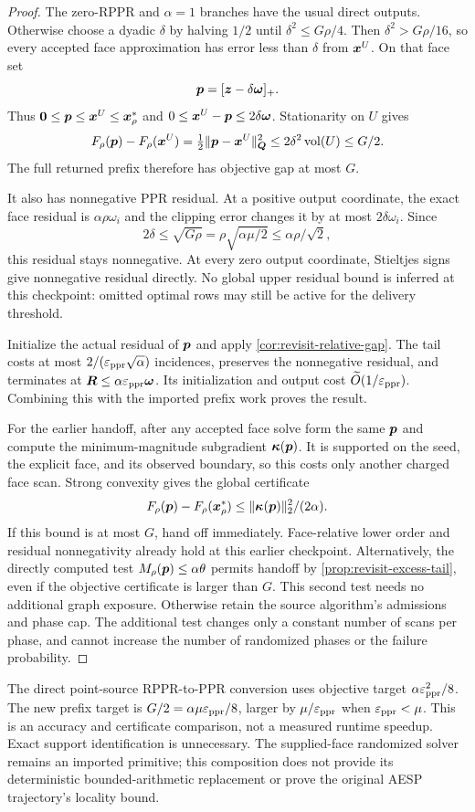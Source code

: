 \begin{proof}
The zero-RPPR and $\alpha=1$ branches have the usual direct outputs.
Otherwise choose a dyadic $\delta$ by halving $1/2$ until
$\delta^2\leq G\rho/4$. Then
$\delta^2>G\rho/16$, so every accepted face approximation has error
less than $\delta$ from $\bm{x}^U$. On that face set
\[
 \bm{p}=[\bm{z}-\delta\bm{\omega}]_+.
\]
Thus $\bm{0}\leq\bm{p}\leq\bm{x}^U\leq\bm{x}_\rho^*$ and
$0\leq\bm{x}^U-\bm{p}\leq2\delta\bm{\omega}$. Stationarity on $U$ gives
\[
 F_\rho(\bm{p})-F_\rho(\bm{x}^U)
 =\tfrac12\|\bm{p}-\bm{x}^U\|_{\bm{Q}}^2
 \leq2\delta^2\operatorname{vol}(U)\leq G/2.
\]
The full returned prefix therefore has objective gap at most $G$.

It also has nonnegative PPR residual. At a positive output coordinate,
the exact face residual is $\alpha\rho\omega_i$ and the clipping error
changes it by at most $2\delta\omega_i$. Since
\[
 2\delta\leq\sqrt{G\rho}
 =\rho\sqrt{\alpha\mu/2}\leq\alpha\rho/\sqrt2,
\]
this residual stays nonnegative. At every zero output coordinate,
Stieltjes signs give nonnegative residual directly. No global upper
residual bound is inferred at this checkpoint: omitted optimal rows may
still be active for the delivery threshold.

Initialize the actual residual of $\bm{p}$ and apply
\cref{cor:revisit-relative-gap}. The tail costs at most
$2/(\varepsilon_{\mathrm{ppr}}\sqrt\alpha)$ incidences, preserves the nonnegative residual,
and terminates at $\bm R\leq\alpha\varepsilon_{\mathrm{ppr}}\bm{\omega}$.
Its initialization and output cost $\widetilde O(1/\varepsilon_{\mathrm{ppr}})$.
Combining this with the imported prefix work proves the result.

For the earlier handoff, after any accepted face solve form the same
$\bm{p}$ and compute the minimum-magnitude subgradient
$\bm\kappa(\bm{p})$. It is supported on the seed, the explicit face, and
its observed boundary, so this costs only another charged face scan.
Strong convexity gives the global certificate
\[
 F_\rho(\bm{p})-F_\rho(\bm{x}_\rho^*)
 \leq \|\bm\kappa(\bm{p})\|_2^2/(2\alpha).
\]
If this bound is at most $G$, hand off immediately. Face-relative lower
order and residual nonnegativity already hold at this earlier checkpoint.
Alternatively, the directly computed test
$M_\rho(\bm{p})\leq\alpha\theta$ permits handoff by
\cref{prop:revisit-excess-tail}, even if the objective certificate is
larger than $G$. This second test needs no additional graph exposure.
Otherwise retain the source algorithm's admissions and phase cap. The
additional test changes only a constant number of scans per phase, and
cannot increase the number of randomized phases or the failure probability.
\end{proof}

The direct point-source RPPR-to-PPR conversion uses objective target
$\alpha\varepsilon_{\mathrm{ppr}}^2/8$. The new prefix target is
$G/2=\alpha\mu\varepsilon_{\mathrm{ppr}}/8$, larger by $\mu/\varepsilon_{\mathrm{ppr}}$ when
$\varepsilon_{\mathrm{ppr}}<\mu$. This is an accuracy and certificate comparison, not a
measured runtime speedup. Exact support identification is unnecessary.
The supplied-face randomized solver remains an imported primitive; this
composition does not provide its deterministic bounded-arithmetic replacement
or prove the original AESP trajectory's locality bound.
